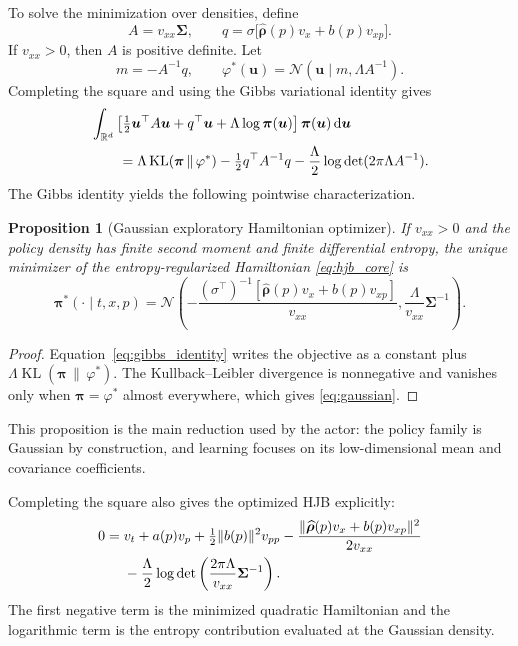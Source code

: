 \documentclass[a4paper,10pt]{article}
\newtheorem{proposition}{Proposition}
\newcommand{\R}{\mathbb{R}}
\newcommand{\N}{\mathcal{N}}
\newcommand{\dd}{\mathrm{d}}
\newcommand{\bpi}{\bm{\pi}}
\newcommand{\bu}{\bm{u}}
\newcommand{\bSigma}{\bm{\Sigma}}
\newcommand{\brho}{\bm{\rho}}
\begin{document}
To solve the minimization over densities, define
\begin{equation}
A=v_{xx}\bSigma,
\qquad
q=\sigma\bigl[\widehat{\brho}(p)v_x+b(p)v_{xp}\bigr].
\end{equation}
If $v_{xx}>0$, then $A$ is positive definite. Let
\begin{equation}
m=-A^{-1}q,
\qquad
\varphi^*(\bu)=\N(\bu\mid m,\Lambda A^{-1}).
\end{equation}
Completing the square and using the Gibbs variational identity gives
\begin{align}
&\int_{\R^d}
\left[\tfrac12\bu^\top A\bu+q^\top\bu+\Lambda\log\bpi(\bu)\right]
\bpi(\bu)\,\dd\bu \notag\\
&\qquad=
\Lambda\operatorname{KL}(\bpi\,\|\,\varphi^*)
-\tfrac12q^\top A^{-1}q
-\frac{\Lambda}{2}\log\det(2\pi\Lambda A^{-1}).
\label{eq:gibbs_identity}
\end{align}
The Gibbs identity yields the following pointwise characterization.
\begin{proposition}[Gaussian exploratory Hamiltonian optimizer]
\label{prop:gaussian_optimizer}
If $v_{xx}>0$ and the policy density has finite second moment and finite differential entropy, the unique minimizer of the entropy-regularized Hamiltonian \eqref{eq:hjb_core} is
\begin{equation}
\bpi^*(\cdot\mid t,x,p)
=\N\left(
-\frac{(\sigma^\top)^{-1}[\widehat{\brho}(p)v_x+b(p)v_{xp}]}{v_{xx}},
\frac{\Lambda}{v_{xx}}\bSigma^{-1}
\right).
\label{eq:gaussian}
\end{equation}
\end{proposition}

\begin{proof}
Equation~\eqref{eq:gibbs_identity} writes the objective as a constant plus $\Lambda\operatorname{KL}(\bpi\,\|\,\varphi^*)$. The Kullback--Leibler divergence is nonnegative and vanishes only when $\bpi=\varphi^*$ almost everywhere, which gives \eqref{eq:gaussian}.
\end{proof}

This proposition is the main reduction used by the actor: the policy family is Gaussian by construction, and learning focuses on its low-dimensional mean and covariance coefficients.

Completing the square also gives the optimized HJB explicitly:
\begin{align}
0={}&v_t+a(p)v_p+\tfrac12\|b(p)\|^2v_{pp}
-\frac{\|\widehat{\brho}(p)v_x+b(p)v_{xp}\|^2}{2v_{xx}} \notag\\
&-\frac{\Lambda}{2}
\log\det\left(\frac{2\pi\Lambda}{v_{xx}}\bSigma^{-1}\right).
\label{eq:optimized_hjb}
\end{align}
The first negative term is the minimized quadratic Hamiltonian and the logarithmic term is the entropy contribution evaluated at the Gaussian density.
\end{document}
